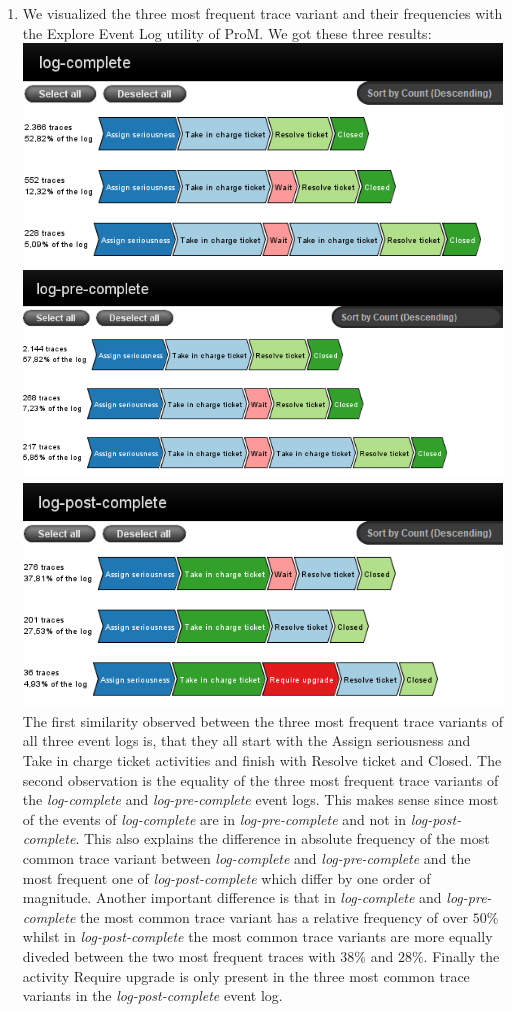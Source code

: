 \documentclass[../../main.tex]{subfiles}
\begin{document}
\begin{enumerate}
\item We visualized the three most frequent trace variant and their frequencies with the Explore Event Log utility of ProM. We got these three results:\\
\includegraphics[width=0.5\columnwidth]{img/ProM_explore_log_complete.png}
\includegraphics[width=0.5\columnwidth]{img/ProM_explore_log_pre.png}
\includegraphics[width=0.5\columnwidth]{img/ProM_explore_log_post.png}\\
The first similarity observed between the three most frequent trace variants of all three event logs is, that they all start with the Assign seriousness and Take in charge ticket activities and finish with Resolve ticket and Closed. The second observation is the equality of the three most frequent trace variants of the \textit{log-complete} and \textit{log-pre-complete} event logs. This makes sense since most of the events of \textit{log-complete} are in \textit{log-pre-complete} and not in \textit{log-post-complete}. This also explains the difference in absolute frequency of the most common trace variant between \textit{log-complete} and \textit{log-pre-complete} and the most frequent one of \textit{log-post-complete} which differ by one order of magnitude. Another important difference is that in \textit{log-complete} and \textit{log-pre-complete} the most common trace variant has a relative frequency of over $50\%$ whilst in \textit{log-post-complete} the most common trace variants are more equally diveded between the two most frequent traces with $38\%$ and $28\%$. Finally the activity Require upgrade is only present in the three most common trace variants in the \textit{log-post-complete} event log.

\end{enumerate}
\end{document}
